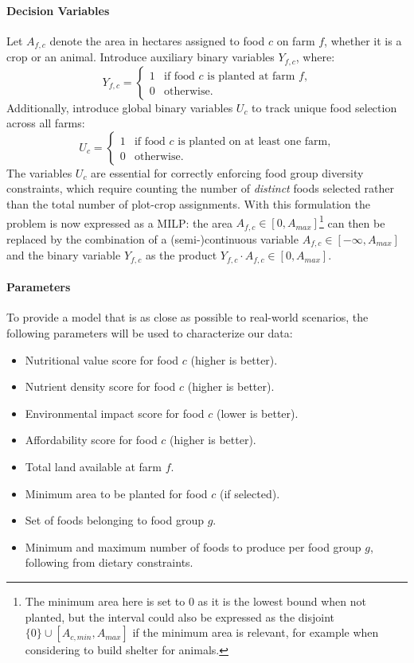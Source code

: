 \documentclass{oqireport}
\begin{document}
\paragraph{Decision Variables}
Let $A_{f,c}$ denote the area in hectares assigned to food $c$ on farm $f$, whether it is a crop or an animal.
Introduce auxiliary binary variables $Y_{f,c}$, where:
\begin{equation}
Y_{f,c} = \begin{cases}
1 & \text{if food $c$ is planted at farm $f$,}\\
0 & \text{otherwise.}
\end{cases}
\end{equation}
Additionally, introduce global binary variables $U_c$ to track unique food selection across all farms:
\begin{equation}
U_c = \begin{cases}
1 & \text{if food $c$ is planted on at least one farm,}\\
0 & \text{otherwise.}
\end{cases}
\end{equation}
The variables $U_c$ are essential for correctly enforcing food group diversity constraints, which require counting the number of \textit{distinct} foods selected rather than the total number of plot-crop assignments.
With this formulation the problem is now expressed as a MILP: the area $A_{f,c} \in [0, A_{max}]$\footnote{The minimum area here is set to 0 as it is the lowest bound when not planted, but the interval could also be expressed as the disjoint $\{0\}\cup[A_{c, min}, A_{max}]$ if the minimum area is relevant, for example when considering to build shelter for animals.} can then be replaced by the combination of a (semi-)continuous variable $A_{f,c} \in [-\infty, A_{max}]$ and the binary variable $Y_{f,c}$ as the product $Y_{f,c} \cdot A_{f,c} \in [0, A_{max}]$. 

\paragraph{Parameters}
To provide a model that is as close as possible to real-world scenarios, the following parameters will be used to characterize our data:
\begin{itemize}
    \item Nutritional value score for food $c$ (higher is better).
    \item Nutrient density score for food $c$ (higher is better).
    \item Environmental impact score for food $c$ (lower is better).
    \item Affordability score for food $c$ (higher is better).
    \item Total land available at farm $f$.
    \item Minimum area to be planted for food $c$ (if selected).
    \item Set of foods belonging to food group $g$.
    \item Minimum and maximum number of foods to produce per food group $g$, following from dietary constraints.
\end{itemize}
\end{document}
